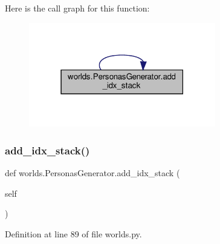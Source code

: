 Here is the call graph for this function\+:
\nopagebreak
\begin{figure}[H]
\begin{center}
\leavevmode
\includegraphics[width=231pt]{classworlds_1_1PersonasGenerator_a2eecaa6079fea0384e1e8538991196e9_cgraph}
\end{center}
\end{figure}
\mbox{\label{classworlds_1_1PersonasGenerator_a2eecaa6079fea0384e1e8538991196e9}} 
\subsubsection{\texorpdfstring{add\+\_\+idx\+\_\+stack()}{add\_idx\_stack()}\hspace{0.1cm}{\footnotesize\ttfamily [2/2]}}
{\footnotesize\ttfamily def worlds.\+Personas\+Generator.\+add\+\_\+idx\+\_\+stack (\begin{DoxyParamCaption}\item[{}]{self }\end{DoxyParamCaption})}



Definition at line 89 of file worlds.\+py.



